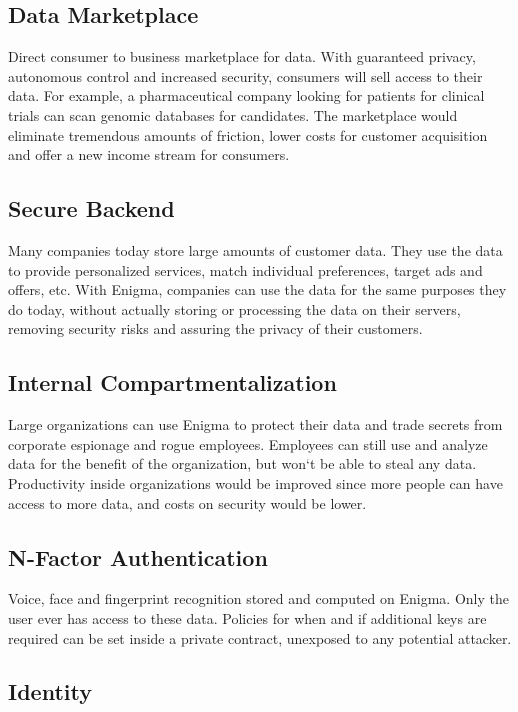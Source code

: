 \documentclass{article} \usepackage{nips13submit_e,times}
\begin{document}
\subsection{Data Marketplace}

Direct consumer to business marketplace for data. With guaranteed privacy, autonomous control and increased security, consumers will sell access to their data. For example, a pharmaceutical company looking for patients for clinical trials can scan genomic databases for candidates. The marketplace would eliminate tremendous amounts of friction, lower costs for customer acquisition and offer a new income stream for consumers.

\subsection{Secure Backend}

Many companies today store large amounts of customer data. They use the data to provide personalized services, match individual preferences, target ads and offers, etc. With Enigma, companies can use the data for the same purposes they do today, without actually storing or processing the data on their servers, removing security risks and assuring the privacy of their customers. 

\subsection{Internal Compartmentalization}

Large organizations can use Enigma to protect their data and trade secrets from corporate espionage and rogue employees. Employees can still use and analyze data for the benefit of the organization, but won`t be able to steal any data. Productivity inside organizations would be improved since more people can have access to more data, and costs on security would be lower.

\subsection{N-Factor Authentication}

Voice, face and fingerprint recognition stored and computed on Enigma. Only the user ever has access to these data. Policies for when and if additional keys are required can be set inside a private contract, unexposed to any potential attacker.

\subsection{Identity}
\end{document}
